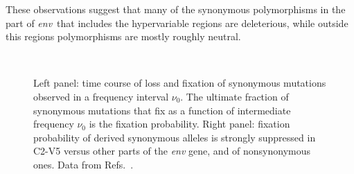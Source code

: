 \documentclass[rmp, twocolumn]{revtex4}
\newcommand{\env}{\textit{env}}
\begin{document}
These observations suggest that many of the synonymous polymorphisms in the part
of \env~that includes the hypervariable regions are deleterious, while outside
this regions polymorphisms are mostly roughly neutral.

\begin{figure}
\begin{center}
\\
\caption{Left panel: time course of loss and fixation of synonymous mutations
 observed in a frequency interval $\nu_0$. The ultimate fraction of synonymous
 mutations that fix as a function of intermediate frequency $\nu_0$ is the
 fixation probability.  Right panel: fixation probability of derived synonymous
alleles is strongly suppressed in C2-V5 versus other parts of the {\it env}
gene, and of nonsynonymous ones. Data from
Refs.~\cite{shankarappa_consistent_1999, bunnik_autologous_2008}.}
\label{fig:fixp}
\end{center}
\end{figure}
\end{document}
